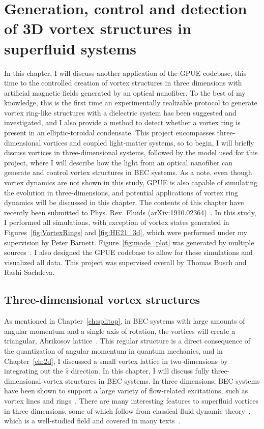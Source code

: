 \chapter{Generation, control and detection of 3D vortex structures in superfluid systems}
\label{ch:vortex_states}

In this chapter, I will discuss another application of the GPUE codebase, this time to the controlled creation of vortex structures in three dimensions with artificial magnetic fields generated by an optical nanofiber.
To the best of my knowledge, this is the first time an experimentally realizable protocol to generate vortex ring-like structures with a dielectric system has been suggested and investigated, and I also provide a method to detect whether a vortex ring is present in an elliptic-toroidal condensate.
This project encompasses three-dimensional vortices and coupled light-matter systems, so to begin, I will briefly discuss vortices in three-dimensional systems, followed by the model used for this project, where I will describe how the light from an optical nanofiber can generate and control vortex structures in BEC systems.
As a note, even though vortex dynamics are not shown in this study, GPUE is also capable of simulating the evolution in three-dimensions, and potential applications of vortex ring dynamics will be discussed in this chapter.
The contents of this chapter have recently been submitted to Phys. Rev. Fluids (arXiv:1910.02364)~\cite{schloss2019}.
In this study, I performed all simulations, with exception of vortex states generated in Figures~\ref{fig:VortexRings} and \ref{fig:HE21_3d}, which were performed under my supervision by Peter Barnett.
Figure~\ref{fig:mode_plot} was generated by multiple sources~\cite{nieddu2016, kumar2015}.
I also designed the GPUE codebase to allow for these simulations and visualized all data.
This project was supervised overall by Thomas Busch and Rashi Sachdeva.


\section{Three-dimensional vortex structures}
\label{sec:vortex}

As mentioned in Chapter~\ref{ch:splitop}, in BEC systems with large amounts of angular momentum and a single axis of rotation, the vortices will create a triangular, Abrikosov lattice~\cite{abo2001, abrikosov1957}. 
This regular structure is a direct consequence of the quantization of angular momentum in quantum mechanics, and in Chapter~\ref{ch:2d}, I discussed a small vortex lattice in two-dimensions by integrating out the $\hat z$ direction.
In this chapter, I will discuss fully three-dimensional vortex structures in BEC systems. 
In three dimensions, BEC systems have been shown to support a large variety of flow-related excitations, such as vortex lines and rings~\cite{madison2000,abo2001, wacks2014, anderson2001, bulgac2014, ku2016, matthews1999, yefsah2013}.
There are many interesting features to superfluid vortices in three dimensions, some of which follow from classical fluid dynamic theory~\cite{fetter2009}, which is a well-studied field and covered in many texts~\cite{faber1995, kundu2012, tritton1988, landau1987}.

